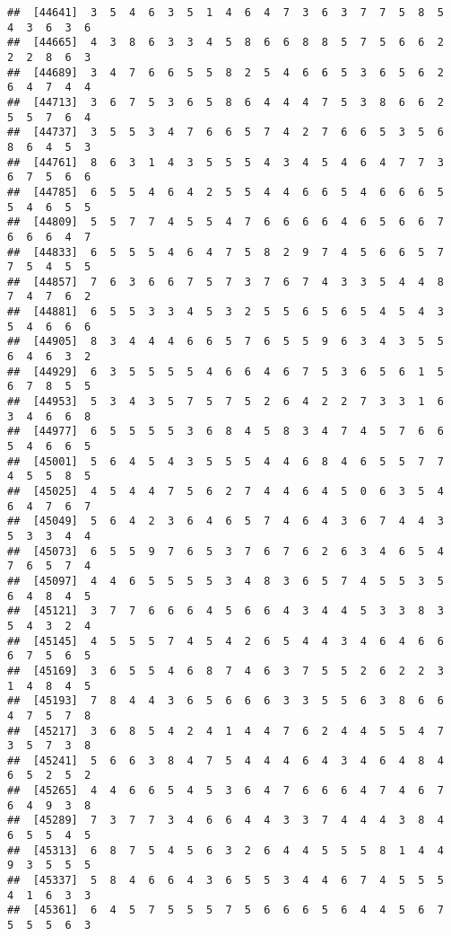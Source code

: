 \documentclass[
]{book}
\begin{document}
\begin{verbatim}
##  [44641]  3  5  4  6  3  5  1  4  6  4  7  3  6  3  7  7  5  8  5  4  3  6  3  6
##  [44665]  4  3  8  6  3  3  4  5  8  6  6  8  8  5  7  5  6  6  2  2  2  8  6  3
##  [44689]  3  4  7  6  6  5  5  8  2  5  4  6  6  5  3  6  5  6  2  6  4  7  4  4
##  [44713]  3  6  7  5  3  6  5  8  6  4  4  4  7  5  3  8  6  6  2  5  5  7  6  4
##  [44737]  3  5  5  3  4  7  6  6  5  7  4  2  7  6  6  5  3  5  6  8  6  4  5  3
##  [44761]  8  6  3  1  4  3  5  5  5  4  3  4  5  4  6  4  7  7  3  6  7  5  6  6
##  [44785]  6  5  5  4  6  4  2  5  5  4  4  6  6  5  4  6  6  6  5  5  4  6  5  5
##  [44809]  5  5  7  7  4  5  5  4  7  6  6  6  6  4  6  5  6  6  7  6  6  6  4  7
##  [44833]  6  5  5  5  4  6  4  7  5  8  2  9  7  4  5  6  6  5  7  7  5  4  5  5
##  [44857]  7  6  3  6  6  7  5  7  3  7  6  7  4  3  3  5  4  4  8  7  4  7  6  2
##  [44881]  6  5  5  3  3  4  5  3  2  5  5  6  5  6  5  4  5  4  3  5  4  6  6  6
##  [44905]  8  3  4  4  4  6  6  5  7  6  5  5  9  6  3  4  3  5  5  6  4  6  3  2
##  [44929]  6  3  5  5  5  5  4  6  6  4  6  7  5  3  6  5  6  1  5  6  7  8  5  5
##  [44953]  5  3  4  3  5  7  5  7  5  2  6  4  2  2  7  3  3  1  6  3  4  6  6  8
##  [44977]  6  5  5  5  5  3  6  8  4  5  8  3  4  7  4  5  7  6  6  5  4  6  6  5
##  [45001]  5  6  4  5  4  3  5  5  5  4  4  6  8  4  6  5  5  7  7  4  5  5  8  5
##  [45025]  4  5  4  4  7  5  6  2  7  4  4  6  4  5  0  6  3  5  4  6  4  7  6  7
##  [45049]  5  6  4  2  3  6  4  6  5  7  4  6  4  3  6  7  4  4  3  5  3  3  4  4
##  [45073]  6  5  5  9  7  6  5  3  7  6  7  6  2  6  3  4  6  5  4  7  6  5  7  4
##  [45097]  4  4  6  5  5  5  5  3  4  8  3  6  5  7  4  5  5  3  5  6  4  8  4  5
##  [45121]  3  7  7  6  6  6  4  5  6  6  4  3  4  4  5  3  3  8  3  5  4  3  2  4
##  [45145]  4  5  5  5  7  4  5  4  2  6  5  4  4  3  4  6  4  6  6  6  7  5  6  5
##  [45169]  3  6  5  5  4  6  8  7  4  6  3  7  5  5  2  6  2  2  3  1  4  8  4  5
##  [45193]  7  8  4  4  3  6  5  6  6  6  3  3  5  5  6  3  8  6  6  4  7  5  7  8
##  [45217]  3  6  8  5  4  2  4  1  4  4  7  6  2  4  4  5  5  4  7  3  5  7  3  8
##  [45241]  5  6  6  3  8  4  7  5  4  4  4  6  4  3  4  6  4  8  4  6  5  2  5  2
##  [45265]  4  4  6  6  5  4  5  3  6  4  7  6  6  6  4  7  4  6  7  6  4  9  3  8
##  [45289]  7  3  7  7  3  4  6  6  4  4  3  3  7  4  4  4  3  8  4  6  5  5  4  5
##  [45313]  6  8  7  5  4  5  6  3  2  6  4  4  5  5  5  8  1  4  4  9  3  5  5  5
##  [45337]  5  8  4  6  6  4  3  6  5  5  3  4  4  6  7  4  5  5  5  4  1  6  3  3
##  [45361]  6  4  5  7  5  5  5  7  5  6  6  6  5  6  4  4  5  6  7  5  5  5  6  3

\end{verbatim}
\end{document}
